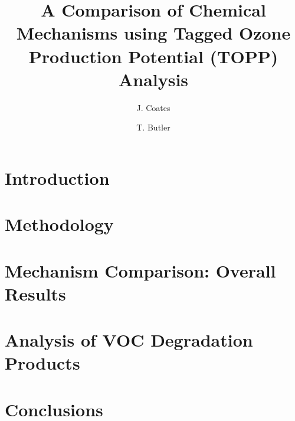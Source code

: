 \documentclass[11pt,a4paper]{article}
\title{A Comparison of Chemical Mechanisms using Tagged Ozone Production Potential (TOPP) Analysis}
\author[1]{J. Coates}%
\author[1]{T. Butler}
\affil[1]{Institute for Advanced Sustainability Studies, Potsdam, Germany}
\begin{document}
\maketitle

\begin{abstract}
    
\end{abstract}

\section{Introduction} \label{s:introduction}


\section{Methodology} \label{s:methodology}


\section{Mechanism Comparison: Overall Results} \label{s:overall_results}


\section{Analysis of VOC Degradation Products} \label{s:detailed_results}


\section{Conclusions} \label{s:conclusions}




 
\end{document}

